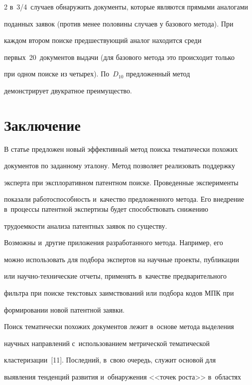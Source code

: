 \begin{multicols}{2}
в~3/4~случаев обнаружить документы, которые являются прямыми аналогами 

поданных заявок (против менее половины случаев у базового метода). При 

каждом втором поиске предшествующий аналог находится среди 

первых~20~документов выдачи (для базового метода это происходит только 

при одном поиске из четырех). По~$D_{10}$ предложенный метод 

демонстрирует двукратное преимущество.

  

\section{Заключение}

     

  В статье предложен новый эффективный метод поиска тематически похожих 

документов по заданному эталону. Метод позволяет реализовать поддержку 

эксперта при эксплоративном патентном поиске. Проведенные эксперименты 

показали работоспособность и~качество предложенного метода. Его внедрение в~процессы патентной экспертизы будет способствовать снижению 

трудоемкости анализа патентных заявок по существу.

  

  Возможны и~другие приложения разработанного метода. Например, его 

можно использовать для подбора экспертов на научные проекты, публикации 

или на\-уч\-но-тех\-ни\-че\-ские отчеты, применять в~качестве предварительного 

фильтра при поиске текстовых заимствований или подбора кодов МПК при 

формировании новой патентной заявки. 

  

  Поиск тематически похожих документов лежит в~основе метода выделения 

научных направлений с~использованием метрической тематической 

клас\-те\-ри\-за\-ции~[11]. Последний, в~свою очередь, служит основой для 

выявления тенденций развития и~обнаружения <<точек роста>> в~областях 


\end{multicols}
